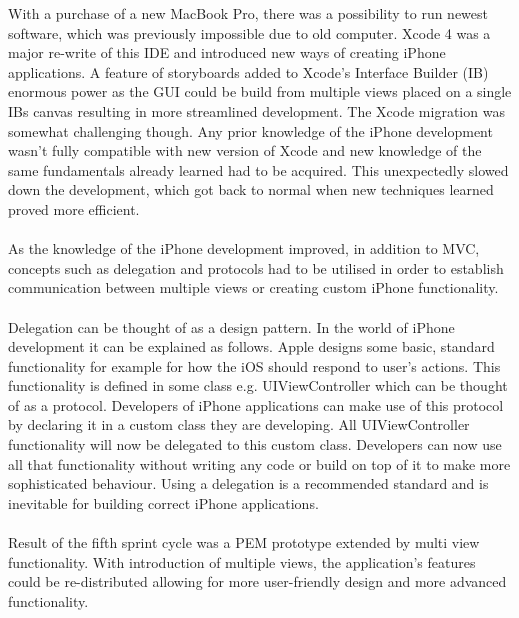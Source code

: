 \documentclass[12pt, a4paper]{report}   %
\begin{document}
\begin{enumerate}
With a purchase of a new MacBook Pro, there was a possibility to run newest software, which was previously impossible due to old computer. Xcode 4 was a major re-write of this IDE and introduced new ways of creating iPhone applications. A feature of storyboards added to Xcode's Interface Builder (IB) enormous power as the GUI could be build from multiple views placed on a single IBs canvas resulting in more streamlined development. The Xcode migration was somewhat challenging though. Any prior knowledge of the iPhone development wasn't fully compatible with new version of Xcode and new knowledge of the same fundamentals already learned had to be acquired. This unexpectedly slowed down the development, which got back to normal when new techniques learned proved more efficient.\\ \\
As the knowledge of the iPhone development improved, in addition to MVC, concepts such as delegation and protocols had to be utilised in order to establish communication between multiple views or creating custom iPhone functionality.\\ \\
Delegation can be thought of as a design pattern. In the world of iPhone development it can be explained as follows. Apple designs some basic, standard functionality for example for how the iOS should respond to user's actions. This functionality is defined in some class e.g. UIViewController which can be thought of as a protocol. Developers of iPhone applications can make use of this protocol by declaring it in a custom class they are developing. All UIViewController functionality will now be delegated to this custom class. Developers can now use all that functionality without writing any code or build on top of it to make more sophisticated behaviour. Using a delegation is a recommended standard and is inevitable for building correct iPhone applications.\\ \\
Result of the fifth sprint cycle was a PEM prototype extended by multi view functionality. With introduction of multiple views, the application's features could be re-distributed allowing for more user-friendly design and more advanced functionality.\\ \\

\end{enumerate}
\end{document}

